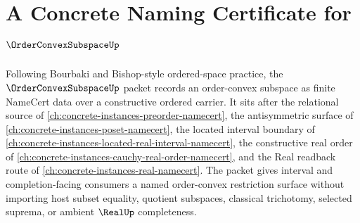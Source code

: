 \chapter{A Concrete Naming Certificate for $\OrderConvexSubspaceUp$}
\label{ch:concrete-instances-order-convex-subspace-namecert}

Following Bourbaki and Bishop-style ordered-space practice, the $\OrderConvexSubspaceUp$ packet records an order-convex subspace as finite NameCert data over a constructive ordered carrier. It sits after the relational source of \autoref{ch:concrete-instances-preorder-namecert}, the antisymmetric surface of \autoref{ch:concrete-instances-poset-namecert}, the located interval boundary of \autoref{ch:concrete-instances-located-real-interval-namecert}, the constructive real order of \autoref{ch:concrete-instances-cauchy-real-order-namecert}, and the Real readback route of \autoref{ch:concrete-instances-real-namecert}. The packet gives interval and completion-facing consumers a named order-convex restriction surface without importing host subset equality, quotient subspaces, classical trichotomy, selected suprema, or ambient $\RealUp$ completeness.


